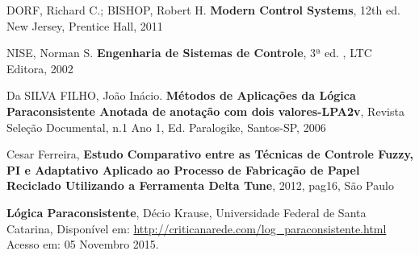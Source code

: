\documentclass[12pt,a4paper]{report}
\begin{document}




\begin{thebibliography}{9}


	DORF, Richard C.; BISHOP, Robert H.
	\textbf{Modern Control Systems},
	12th ed.
	New Jersey, 
	Prentice Hall,
	2011


	NISE, Norman S.
	\textbf{Engenharia de Sistemas de Controle},
	3ª ed. ,
	LTC Editora,
	2002

	Da SILVA FILHO, João Inácio.
	\textbf{Métodos de Aplicações da Lógica Paraconsistente Anotada de anotação com dois valores-LPA2v},
	Revista Seleção Documental,
	n.1 Ano 1,
	Ed. Paralogike,
	Santos-SP,
	2006


	Cesar Ferreira,
	\textbf{Estudo Comparativo entre as Técnicas de 		Controle Fuzzy, PI e Adaptativo Aplicado ao 			Processo de Fabricação de Papel Reciclado 			Utilizando a Ferramenta Delta Tune},
	2012,
	pag16,
	São Paulo


	\textbf{Lógica Paraconsistente},
	Décio Krause,
	Universidade Federal de Santa Catarina, 
	Disponível em: \url{http://criticanarede.com/log_paraconsistente.html} \\
	Acesso em: 05 Novembro 2015.
	

\end{thebibliography}


\end{document}
